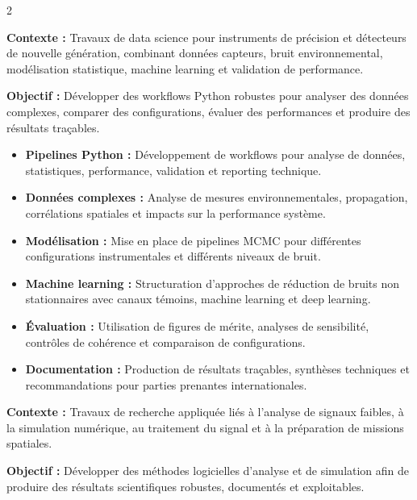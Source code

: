\documentclass[8pt,a4paper,ragged2e,withhyper]{altacv}
\begin{document}
\begin{paracol}{2}

\textbf{Contexte :} Travaux de data science pour instruments de précision et détecteurs de nouvelle génération, combinant données capteurs, bruit environnemental, modélisation statistique, machine learning et validation de performance.

\textbf{Objectif :} Développer des workflows Python robustes pour analyser des données complexes, comparer des configurations, évaluer des performances et produire des résultats traçables.

\begin{itemize}
  \item \textbf{Pipelines Python :} Développement de workflows pour analyse de données, statistiques, performance, validation et reporting technique.
  \item \textbf{Données complexes :} Analyse de mesures environnementales, propagation, corrélations spatiales et impacts sur la performance système.
  \item \textbf{Modélisation :} Mise en place de pipelines MCMC pour différentes configurations instrumentales et différents niveaux de bruit.
  \item \textbf{Machine learning :} Structuration d’approches de réduction de bruits non stationnaires avec canaux témoins, machine learning et deep learning.
  \item \textbf{Évaluation :} Utilisation de figures de mérite, analyses de sensibilité, contrôles de cohérence et comparaison de configurations.
  \item \textbf{Documentation :} Production de résultats traçables, synthèses techniques et recommandations pour parties prenantes internationales.
\end{itemize}

\divider


\textbf{Contexte :} Travaux de recherche appliquée liés à l’analyse de signaux faibles, à la simulation numérique, au traitement du signal et à la préparation de missions spatiales.

\textbf{Objectif :} Développer des méthodes logicielles d’analyse et de simulation afin de produire des résultats scientifiques robustes, documentés et exploitables.


\end{paracol}
\end{document}

